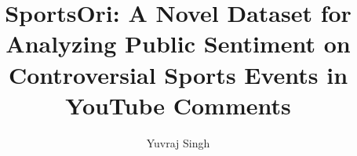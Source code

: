 \documentclass[sigconf, review]{acmart}
\begin{document}
\title{SportsOri: A Novel Dataset for Analyzing Public Sentiment on Controversial Sports Events in YouTube Comments}










\author{Yuvraj Singh}
\end{document}
